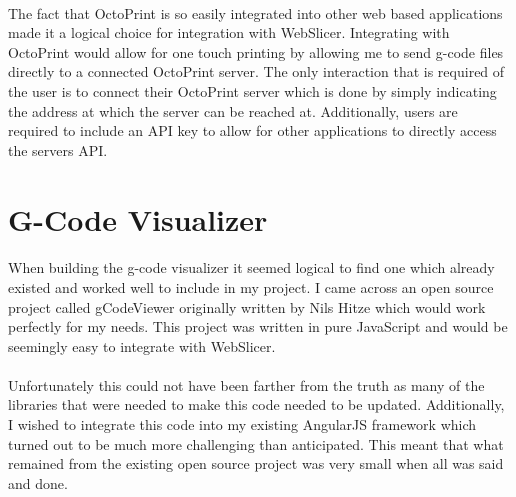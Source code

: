 \paragraph{}
The fact that OctoPrint is so easily integrated into other web based applications made it a logical choice for integration with WebSlicer.
Integrating with OctoPrint would allow for one touch printing by allowing me to send g-code files directly to a connected OctoPrint server.
The only interaction that is required of the user is to connect their OctoPrint server which is done by simply indicating the address at which the server can be reached at.
Additionally, users are required to include an API key to allow for other applications to directly access the servers API.
 
\section{G-Code Visualizer}
\paragraph{}
When building the g-code visualizer it seemed logical to find one which already existed and worked well to include in my project.
I came across an open source project called gCodeViewer originally written by Nils Hitze which would work perfectly for my needs. \cite{hitzeViewer-2015}
This project was written in pure JavaScript and would be seemingly easy to integrate with WebSlicer.

\paragraph{}
Unfortunately this could not have been farther from the truth as many of the libraries that were needed to make this code needed to be updated.
Additionally, I wished to integrate this code into my existing AngularJS framework which turned out to be much more challenging than anticipated.
This meant that what remained from the existing open source project was very small when all was said and done.
